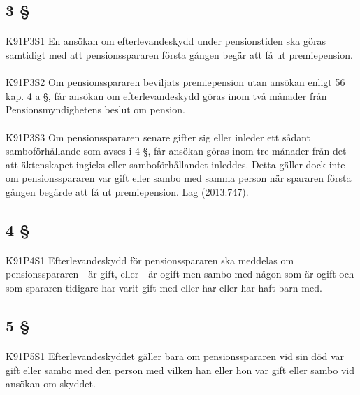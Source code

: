 \documentclass[a4paper,notitlepage,openany,10pt]{book}
\begin{document}
\subsection*{3 §}
\paragraph*{}
{\tiny K91P3S1}
En ansökan om efterlevandeskydd under pensionstiden ska göras samtidigt med att pensionsspararen första gången begär att få ut premiepension.
\paragraph*{}
{\tiny K91P3S2}
Om pensionsspararen beviljats premiepension utan ansökan enligt 56 kap. 4 a §, får ansökan om efterlevandeskydd göras inom två månader från Pensionsmyndighetens beslut om pension.
\paragraph*{}
{\tiny K91P3S3}
Om pensionsspararen senare gifter sig eller inleder ett sådant samboförhållande som avses i 4 §, får ansökan göras inom tre månader från det att äktenskapet ingicks eller samboförhållandet inleddes. Detta gäller dock inte om pensionsspararen var gift eller sambo med samma person när spararen första gången begärde att få ut premiepension.
Lag (2013:747).
\subsection*{4 §}
\paragraph*{}
{\tiny K91P4S1}
Efterlevandeskydd för pensionsspararen ska meddelas om pensionsspararen
\newline - är gift, eller
\newline - är ogift men sambo med någon som är ogift och som spararen tidigare har varit gift med eller har eller har haft barn med.
\subsection*{5 §}
\paragraph*{}
{\tiny K91P5S1}
Efterlevandeskyddet gäller bara om pensionsspararen vid sin död var gift eller sambo med den person med vilken han eller hon var gift eller sambo vid ansökan om skyddet.
\end{document}
